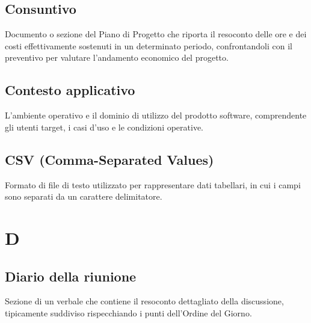 \documentclass[a4paper, 11pt, oneside]{scrartcl} %
\begin{document}
\subsection*{Consuntivo}
Documento o sezione del Piano di Progetto che riporta il resoconto delle ore e dei costi effettivamente sostenuti in un determinato periodo, confrontandoli con il preventivo per valutare l'andamento economico del progetto.
\vspace{0.5cm}

\subsection*{Contesto applicativo}


L'ambiente operativo e il dominio di utilizzo del prodotto software, comprendente gli utenti target, i casi d'uso e le condizioni operative.

\vspace{0.5cm}

\subsection*{CSV (Comma-Separated Values)}
Formato di file di testo utilizzato per rappresentare dati tabellari, in cui i campi sono separati da un carattere delimitatore.
\vspace{0.5cm}


\section*{D}


\subsection*{Diario della riunione}


Sezione di un verbale che contiene il resoconto dettagliato della discussione, tipicamente suddiviso rispecchiando i punti dell'Ordine del Giorno.

\vspace{0.5cm}
\end{document}
